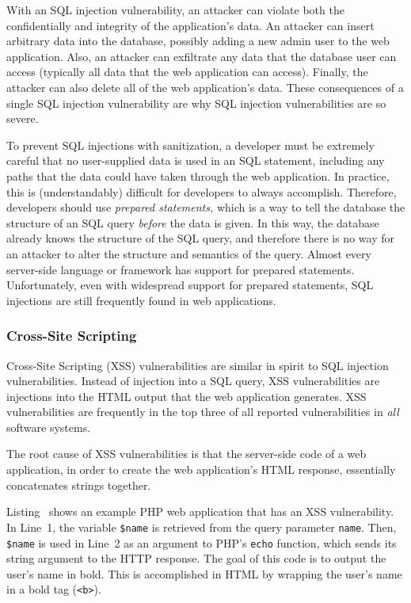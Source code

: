With an SQL injection vulnerability, an attacker can violate both the
confidentially and integrity of the application's data. An attacker
can insert arbitrary data into the database, possibly adding a new
admin user to the web application. Also, an attacker can exfiltrate
any data that the database user can access (typically all data that
the web application can access). Finally, the attacker can also delete
all of the web application's data. These consequences of a single SQL
injection vulnerability are why SQL injection vulnerabilities are so
severe.

To prevent SQL injections with sanitization, a developer must be
extremely careful that no user-supplied data is used in an SQL
statement, including any paths that the data could have taken through
the web application. In practice, this is (understandably) difficult
for developers to always accomplish. Therefore, developers should use
\emph{prepared statements,} which is a way to tell the database the
structure of an SQL query \emph{before} the data is given. In this
way, the database already knows the structure of the SQL query, and
therefore there is no way for an attacker to alter the structure and
semantics of the query. Almost every server-side language or framework
has support for prepared statements. Unfortunately, even with
widespread support for prepared statements, SQL injections are still
frequently found in web applications.

\subsubsection{Cross-Site Scripting}

Cross-Site Scripting (XSS) vulnerabilities are similar in spirit to
SQL injection vulnerabilities. Instead of injection into a SQL
query, XSS vulnerabilities are injections into the HTML output that
the web application generates. XSS vulnerabilities are frequently in
the top three of all reported vulnerabilities in \emph{all} software
systems.

The root cause of XSS vulnerabilities is that the server-side code of
a web application, in order to create the web application's HTML
response, essentially concatenates strings together.



Listing~ shows an example PHP web application
that has an XSS vulnerability. In Line~1, the variable \texttt{\$name}
is retrieved from the query parameter \texttt{name}. Then,
\texttt{\$name} is used in Line~2 as an argument to PHP's
\texttt{echo} function, which sends its string argument to the HTTP
response. The goal of this code is to output the user's name in bold.
This is accomplished in HTML by wrapping the user's name in a bold tag
(\texttt{<b>}).

